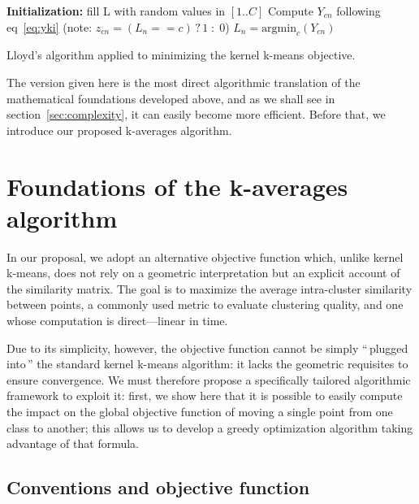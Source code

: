 \documentclass[natbib,smallextended]{svjour3}
\newcommand{\cad}{---} %
\newcommand{\gl}[1]{``\,#1\,''} %
\begin{document}
\begin{algorithm}
	\label{algo:kkmeans}
	\SetAlgoLined
	\BlankLine
	\textbf{Initialization:} fill L with random values in $[1..C]$\;
	\BlankLine
	 {
		 {
			 {
				Compute $Y_{cn}$ following eq~\ref{eq:yki} \label{algline:kkmeans_cplx1}
				(note: $z_{cn} = (L_n == c)\,?\,1\;:\;0$)
			}
			$L_n = \textrm{argmin}_c (Y_{cn})$\;
		}
	}
	\BlankLine
	\caption{Lloyd's algorithm applied to minimizing the kernel k-means objective.}
\end{algorithm}

The version given here is the most direct algorithmic translation of the mathematical foundations developed above, and as we shall see in section~\ref{sec:complexity}, it can easily become more efficient. Before that, we introduce our proposed k-averages algorithm.


\section{Foundations of the k-averages algorithm} \label{sec:kaverages}

In our proposal, we adopt an alternative objective function which, unlike kernel k-means, does not rely on a geometric interpretation but an explicit account of the similarity matrix. The goal is to maximize the average intra-cluster similarity between points, a commonly used metric to evaluate clustering quality, and one whose computation is direct\cad{}linear in time.

Due to its simplicity, however, the objective function cannot be simply \gl{plugged into} the standard kernel k-means algorithm: it lacks the geometric requisites to ensure convergence. We must therefore propose a specifically tailored algorithmic framework to exploit it: first, we show here that it is possible to easily compute the impact on the global objective function of moving a single point from one class to another; this allows us to develop a greedy optimization algorithm taking advantage of that formula.

\subsection{Conventions and objective function}
\end{document}
